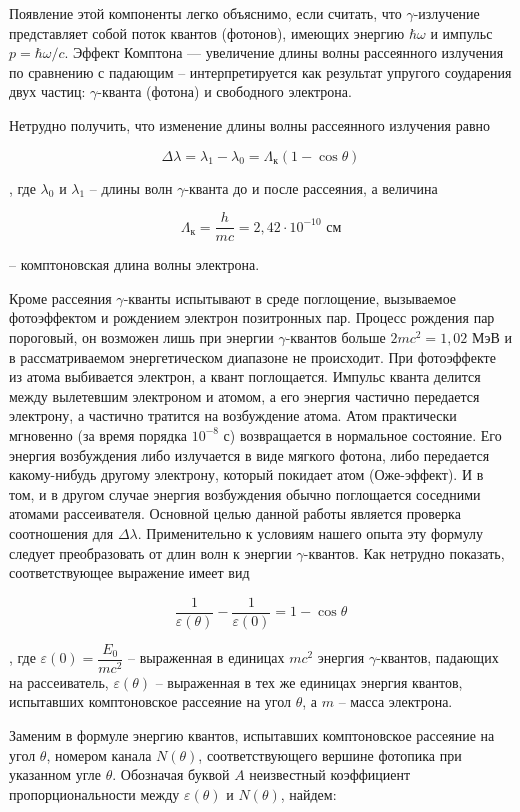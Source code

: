 \documentclass[a4paper,12pt]{article}
\begin{document}
	Появление этой компоненты легко объяснимо, если считать, что $\gamma$-излучение представляет собой поток квантов (фотонов), имеющих энергию $\hbar \omega$ и импульс $p = \hbar \omega / c$. Эффект Комптона — увеличение длины волны рассеянного излучения по сравнению с падающим -- интерпретируется как результат упругого соударения двух частиц: $\gamma$-кванта (фотона) и свободного электрона.
	
	Нетрудно получить, что изменение длины волны рассеянного излучения равно
	
	\[\Delta \lambda = \lambda_1 - \lambda_0 = \Lambda_\text{к} (1 - \cos\theta)\]
	
	, где $\lambda_0$ и $\lambda_1$ -- длины волн $\gamma$-кванта до и после рассеяния, а величина
	
	
	\[	\Lambda_\text{к} = \frac{h}{mc} = 2,42 \cdot 10^{-10} \text{ см}\]
	
	-- комптоновская длина волны электрона.
 
 
 	Кроме рассеяния $\gamma$-кванты испытывают в среде поглощение, вызываемое фотоэффектом и рождением электрон позитронных пар. Процесс рождения пар пороговый, он возможен лишь при энергии $\gamma$-квантов больше $2mc^2 = 1,02$ МэВ и в рассматриваемом энергетическом диапазоне не происходит. При фотоэффекте из атома выбивается электрон, а квант поглощается. Импульс кванта делится между вылетевшим электроном и атомом, а его энергия частично передается электрону, а частично тратится на возбуждение атома. Атом практически мгновенно (за время порядка $10^{-8}$ с) возвращается в нормальное состояние. Его энергия возбуждения либо излучается в виде мягкого фотона, либо передается какому-нибудь другому электрону, который покидает атом (Оже-эффект). И в том, и в другом случае энергия возбуждения обычно поглощается соседними атомами рассеивателя. Основной целью данной работы является проверка соотношения для $\Delta \lambda $. Применительно к условиям нашего опыта эту формулу следует преобразовать от длин волн к энергии $\gamma$-квантов. Как нетрудно показать, соответствующее выражение имеет вид
 
 \[\frac{1}{\varepsilon(\theta)} - \frac{1}{\varepsilon(0)} = 1 - \cos\theta\]
 
 	, где $\varepsilon(0) = \dfrac{E_0}{mc^2}$ -- выраженная в единицах $mc^2$ энергия $\gamma$-квантов, падающих на рассеиватель, $\varepsilon(\theta)$ -- выраженная в тех же единицах энергия квантов, испытавших комптоновское рассеяние на угол $\theta$, а $m$ -- масса электрона.
	
	Заменим в формуле энергию квантов, испытавших комптоновское рассеяние на угол $\theta$, номером канала $N(\theta)$, соответствующего вершине фотопика при указанном угле $\theta$. Обозначая буквой $A$ неизвестный коэффициент пропорциональности между $\varepsilon(\theta)$ и $N(\theta)$, найдем:
	
\end{document}
